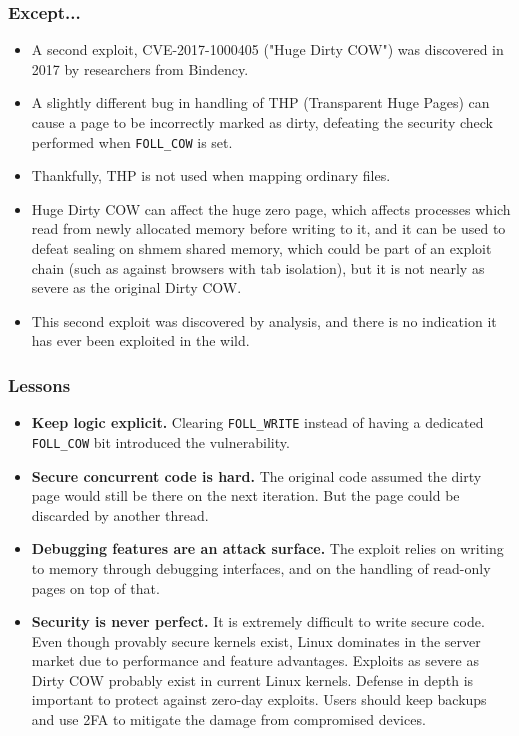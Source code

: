 \documentclass{beamer}
\newcommand{\code}[1]{\texttt{#1}}
\begin{document}
\begin{frame}
\frametitle{Except...}
\begin{itemize}

\item
A second exploit, CVE-2017-1000405 ("Huge Dirty COW") was discovered in 2017 by researchers from Bindency.

\item
A slightly different bug in handling of THP (Transparent Huge Pages) can cause
a page to be incorrectly marked as dirty, defeating the security check performed when \code{FOLL\_COW} is set.

\item
Thankfully, THP is not used when mapping ordinary files.

\item
Huge Dirty COW can affect the huge zero page, which affects processes which read from newly allocated memory before writing to it,
and it can be used to defeat sealing on shmem shared memory, which could be part of an exploit chain (such as against browsers with tab isolation),
but it is not nearly as severe as the original Dirty COW.

\item
This second exploit was discovered by analysis, and there is no indication it has ever been exploited in the wild.

\end{itemize}
\end{frame}

\begin{frame}
\frametitle{Lessons}
\begin{itemize}

\item
\textbf{Keep logic explicit.} Clearing \code{FOLL\_WRITE} instead of having a dedicated \code{FOLL\_COW} bit introduced the vulnerability.

\item
\textbf{Secure concurrent code is hard.} The original code assumed the dirty page would still be there on the next iteration. But the page could be discarded by another thread.

\item
\textbf{Debugging features are an attack surface.} The exploit relies on writing to memory through debugging interfaces, and on the handling of read-only pages on top of that.

\item
\textbf{Security is never perfect.} It is extremely difficult to write secure code.
Even though provably secure kernels exist, Linux dominates in the server market due to performance and feature advantages.
Exploits as severe as Dirty COW probably exist in current Linux kernels.
Defense in depth is important to protect against zero-day exploits.
Users should keep backups and use 2FA to mitigate the damage from compromised devices.

\end{itemize}
\end{frame}
\end{document}
